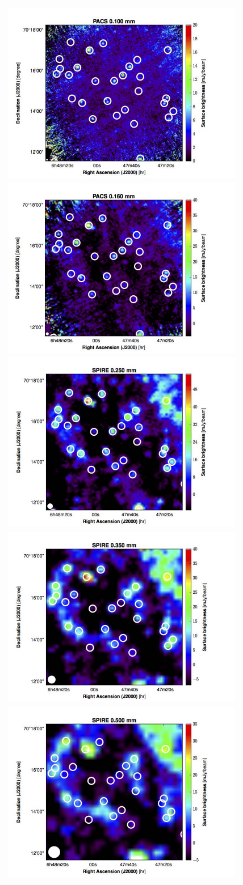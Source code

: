 \documentclass[traditabstract]{aa}
\begin{document}
\begin{figure}[h!]
\centering
\includegraphics[height=4.5cm]{Pacs_100.jpeg}
\includegraphics[height=4.5cm]{Pacs_160.jpeg}
\includegraphics[height=4.5cm]{Spire_250.jpeg}
\includegraphics[height=4.5cm]{Spire_350.jpeg}
\includegraphics[height=4.5cm]{Spire_500.jpeg}

\end{figure}
\end{document}
